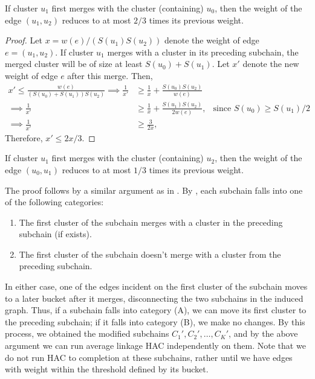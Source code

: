 \begin{lemma}\label{lem:path_A}
    If cluster $u_1$ first merges with the cluster (containing) $u_0$, then the weight of the edge $(u_1,u_2)$ reduces to at most $2/3$ times its previous weight.
\end{lemma}
\begin{proof}
    Let $x = w(e)/(S(u_1)S(u_2))$ denote the weight of edge $e=(u_1,u_2)$. If cluster $u_1$ merges with a cluster in its preceding subchain, the merged cluster will be of size at least $S(u_0)+S(u_1)$. Let $x'$ denote the new weight of edge $e$ after this merge. Then,
    \begin{align*}
        x' \le \frac{w(e)}{(S(u_0)+S(u_1))S(u_2)} \implies \frac{1}{x'} &\ge \frac{1}{x} + \frac{S(u_0)S(u_2)}{w(e)}\\
        \implies \frac{1}{x'} &\ge \frac{1}{x} + \frac{S(u_1)S(u_2)}{2w(e)}, & \text{since $S(u_0) \ge S(u_1)/2$}\\
        \implies \frac{1}{x'} &\ge \frac{3}{2x},
    \end{align*}
    Therefore, $x' \le 2x/3$.
\end{proof}

\begin{lemma}\label{lem:path_B}
    If cluster $u_1$ first merges with the cluster (containing) $u_2$, then the weight of the edge $(u_0,u_1)$ reduces to at most $1/3$ times its previous weight.
\end{lemma}
The proof follows by a similar argument as in . By , each subchain falls into one of the following categories:
\begin{enumerate}[label=(\Alph*)]
    \item The first cluster of the subchain merges with a cluster in the preceding subchain (if exists).
    \item The first cluster of the subchain doesn't merge with a cluster from the preceding subchain.
\end{enumerate}
In either case, one of the edges incident on the first cluster of the subchain moves to a later bucket after it merges, disconnecting the two subchains in the induced graph. Thus, if a subchain falls into category (A), we can move its first cluster to the preceding subchain; if it falls into category (B), we make no changes. By this process, we obtained the modified subchains $C_1',C_2',\ldots,C_K'$, and by the above argument we can run average linkage HAC independently on them. Note that we do not run HAC to completion at these subchains, rather until we have edges with weight within the threshold defined by its bucket. 

